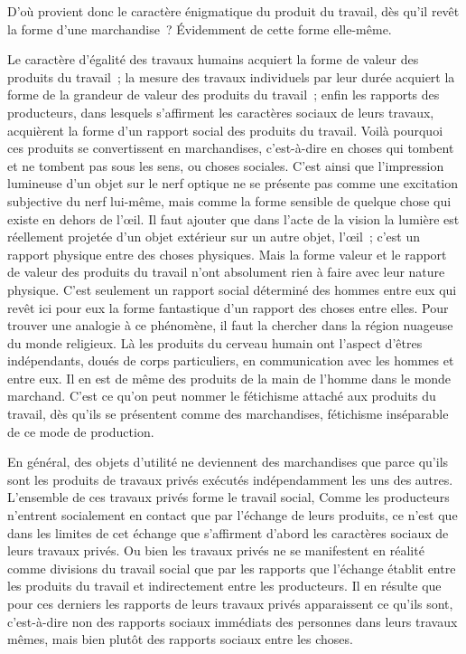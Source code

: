 \documentclass[french,twoside]{book} %
\begin{document}
D’où provient donc le caractère énigmatique du produit du travail, dès qu’il revêt la forme d’une marchandise ? Évidemment de cette forme elle-même.\par
Le caractère d’égalité des travaux humains acquiert la forme de valeur des produits du travail ; la mesure des travaux individuels par leur durée acquiert la forme de la grandeur de valeur des produits du travail ; enfin les rapports des producteurs, dans lesquels s’affirment les caractères sociaux de leurs travaux, acquièrent la forme d’un rapport social des produits du travail. Voilà pourquoi ces produits se convertissent en marchandises, c’est-à-dire en choses qui tombent et ne tombent pas sous les sens, ou choses sociales. C’est ainsi que l’impression lumineuse d’un objet sur le nerf optique ne se présente pas comme une excitation subjective du nerf lui-même, mais comme la forme sensible de quelque chose qui existe en dehors de l’œil. Il faut ajouter que dans l’acte de la vision la lumière est réellement projetée d’un objet extérieur sur un autre objet, l’œil ; c’est un rapport physique entre des choses physiques. Mais la forme valeur et le rapport de valeur des produits du travail n’ont absolument rien à faire avec leur nature physique. C’est seulement un rapport social déterminé des hommes entre eux qui revêt ici pour eux la forme fantastique d’un rapport des choses entre elles. Pour trouver une analogie à ce phénomène, il faut la chercher dans la région nuageuse du monde religieux. Là les produits du cerveau humain ont l’aspect d’êtres indépendants, doués de corps particuliers, en communication avec les hommes et entre eux. Il en est de même des produits de la main de l’homme dans le monde marchand. C’est ce qu’on peut nommer le fétichisme attaché aux produits du travail, dès qu’ils se présentent comme des marchandises, fétichisme inséparable de ce mode de production.\par
En général, des objets d’utilité ne deviennent des marchandises que parce qu’ils sont les produits de travaux privés exécutés indépendamment les uns des autres. L’ensemble de ces travaux privés forme le travail social, Comme les producteurs n’entrent socialement en contact que par l’échange de leurs produits, ce n’est que dans les limites de cet échange que s’affirment d’abord les caractères sociaux de leurs travaux privés. Ou bien les travaux privés ne se manifestent en réalité comme divisions du travail social que par les rapports que l’échange établit entre les produits du travail et indirectement entre les producteurs. Il en résulte que pour ces derniers les rapports de leurs travaux privés apparaissent ce qu’ils sont, c’est-à-dire non des rapports sociaux immédiats des personnes dans leurs travaux mêmes, mais bien plutôt des rapports sociaux entre les choses.\par
\end{document}
